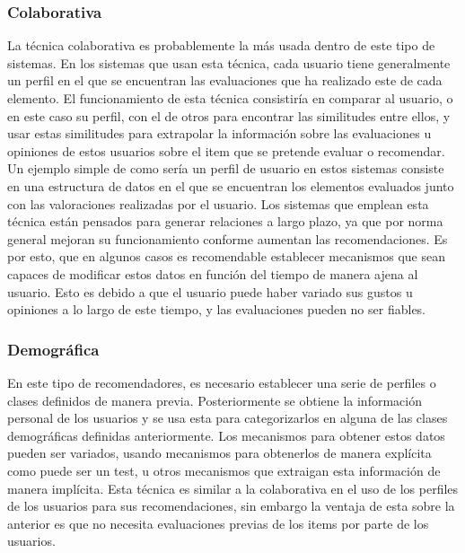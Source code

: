 \subsubsection{Colaborativa}
La técnica colaborativa es probablemente la más usada dentro de este tipo de sistemas. En los sistemas que usan esta técnica, cada usuario tiene generalmente un perfil en el que se encuentran las evaluaciones que ha realizado este de cada elemento. El funcionamiento de esta técnica consistiría en comparar al usuario, o en este caso su perfil, con el de otros para encontrar las similitudes entre ellos, y usar estas similitudes para extrapolar la información sobre las evaluaciones u opiniones de estos usuarios sobre el item que se pretende evaluar o recomendar. Un ejemplo simple de como sería un perfil de usuario en estos sistemas consiste en una estructura de datos en el que se encuentran los elementos evaluados junto con las valoraciones realizadas por el usuario. Los sistemas que emplean esta técnica están pensados para generar relaciones a largo plazo, ya que por norma general mejoran su funcionamiento conforme aumentan las recomendaciones. Es por esto, que en algunos casos es recomendable establecer mecanismos que sean capaces de modificar estos datos en función del tiempo de manera ajena al usuario. Esto es debido a que el usuario puede haber variado sus gustos u opiniones a lo largo de este tiempo, y las evaluaciones pueden no ser fiables. 


\subsubsection{Demográfica}
En este tipo de recomendadores, es necesario establecer una serie de perfiles o clases definidos de manera previa. Posteriormente se obtiene la información personal de los usuarios y se usa esta para categorizarlos en alguna de las clases demográficas definidas anteriormente. Los mecanismos para obtener estos datos pueden ser variados, usando mecanismos para obtenerlos de manera explícita como puede ser un test, u otros mecanismos que extraigan esta información de manera implícita. Esta técnica es similar a la colaborativa en el uso de los perfiles de los usuarios para sus recomendaciones, sin embargo la ventaja de esta sobre la anterior es que no necesita evaluaciones previas de los items por parte de los usuarios.

